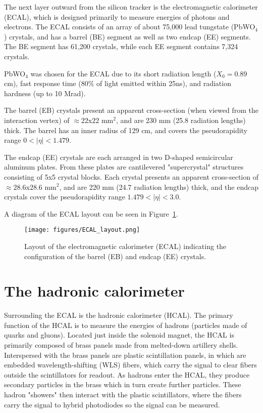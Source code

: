 The next layer outward from the silicon tracker is the electromagnetic calorimeter (ECAL), which is designed primarily to measure energies of photons and electrons. The ECAL consists of an array of about 75,000 lead tungstate (PbWO$_4$) crystals, and has a barrel (BE) segment as well as two endcap (EE) segments. The BE segment has 61,200 crystals, while each EE segment contains 7,324 crystals.

PbWO$_4$ was chosen for the ECAL due to its short radiation length ($X_0 = 0.89$ cm), fast response time ($80\%$ of light emitted within 25ns), and radiation hardness (up to 10 Mrad).

The barrel (EB) crystals present an apparent cross-section (when viewed from the interaction vertex) of $\approx 22$x$22$ mm$^2$, and are 230 mm (25.8 radiation lengths) thick. The barrel has an inner radius of 129 cm, and covers the pseudorapidity range $0 < |\eta| < 1.479$.

The endcap (EE) crystals are each arranged in two D-shaped semicircular aluminum plates. From these plates are cantilevered "supercrystal" structures consisting of 5x5 crystal blocks. Each crystal presents an apparent cross-section of $\approx 28.6$x$28.6$ mm$^2$, and are 220 mm (24.7 radiation lengths) thick, and the endcap crystals cover the pseudorapidity range $1.479 < |\eta| < 3.0$.

A diagram of the ECAL layout can be seen in Figure~\ref{fig:ECAL_layout}.

\begin{figure}\centering
  \texttt{[image: figures/ECAL\_layout.png]}
  \caption{\label{fig:ECAL_layout} Layout of the electromagnetic calorimeter (ECAL) indicating the configuration of the barrel (EB) and endcap (EE) crystals.}
\end{figure}


\section{The hadronic calorimeter}

Surrounding the ECAL is the hadronic calorimeter (HCAL). The primary function of the HCAL is to measure the energies of hadrons (particles made of quarks and gluons). Located just inside the solenoid magnet, the HCAL is primarily composed of brass panels made from melted-down artillery shells. Interspersed with the brass panels are plastic scintillation panels, in which are embedded wavelength-shifting (WLS) fibers, which carry the signal to clear fibers outside the scintillators for readout. As hadrons enter the HCAL, they produce secondary particles in the brass which in turn create further particles. These hadron "showers" then interact with the plastic scintillators, where the fibers carry the signal to hybrid photodiodes so the signal can be measured.


